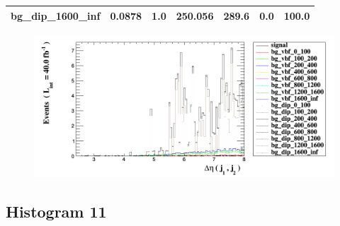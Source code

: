 \documentclass[a4paper, 10pt]{article}
\begin{document}
\begin{table}[H]
\begin{center}
\begin{tabular}{|m{23.0mm}|m{23.0mm}|m{18.0mm}|m{19.0mm}|m{19.0mm}|m{19.0mm}|m{19.0mm}|}
      \hline
      {\cellcolor{white}         bg\_dip\_1600\_inf}& {\cellcolor{white}         0.0878}& {\cellcolor{white}         1.0}& {\cellcolor{white}         250.056}& {\cellcolor{white}         289.6}& {\cellcolor{red}         0.0}& {\cellcolor{red}         100.0}\\
\hline
    \end{tabular}
  \end{center}
\end{table}

\begin{figure}[H]
  \begin{center}
    \includegraphics[scale=0.45]{selection_9.png}\\
\caption{   }
  \end{center}
\end{figure}
      \newpage
\subsection{ Histogram 11}
\end{document}
